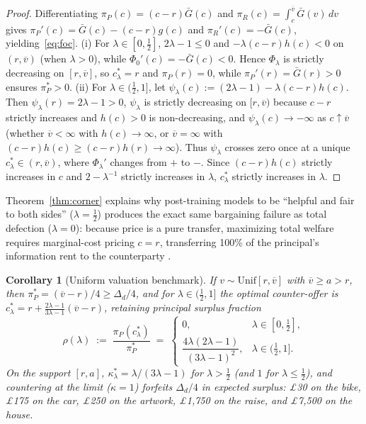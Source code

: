 \documentclass[10.5pt]{article}
\newtheorem{corollary}{Corollary}
\theoremstyle{definition}
\begin{document}
\begin{proof}
Differentiating $\pi_P(c) = (c-r)\bar{G}(c)$ and $\pi_R(c) = \int_c^{\overline v}\bar{G}(v)\,dv$ gives $\pi_P'(c) = \bar{G}(c) - (c-r)g(c)$ and $\pi_R'(c) = -\bar{G}(c)$, yielding~\eqref{eq:foc}.
(i) For $\lambda \in [0, \tfrac{1}{2}]$, $2\lambda - 1 \le 0$ and $-\lambda(c-r)h(c) < 0$ on $(r, \overline v)$ (when $\lambda > 0$), while $\Phi_0'(c) = -\bar{G}(c) < 0$. Hence $\Phi_\lambda$ is strictly decreasing on $[r, \overline v]$, so $c_\lambda^* = r$ and $\pi_P(r) = 0$, while $\pi_P'(r) = \bar{G}(r) > 0$ ensures $\pi_P^* > 0$.
(ii) For $\lambda \in (\tfrac{1}{2}, 1]$, let $\psi_\lambda(c) := (2\lambda - 1) - \lambda(c-r)h(c)$. Then $\psi_\lambda(r) = 2\lambda - 1 > 0$, $\psi_\lambda$ is strictly decreasing on $[r, \overline v)$ because $c-r$ strictly increases and $h(c) > 0$ is non-decreasing, and $\psi_\lambda(c) \to -\infty$ as $c \uparrow \overline v$ (whether $\overline v < \infty$ with $h(c) \to \infty$, or $\overline v = \infty$ with $(c-r)h(c) \ge (c-r)h(r) \to \infty$). Thus $\psi_\lambda$ crosses zero once at a unique $c_\lambda^* \in (r, \overline v)$, where $\Phi_\lambda'$ changes from $+$ to $-$. Since $(c-r)h(c)$ strictly increases in $c$ and $2 - \lambda^{-1}$ strictly increases in $\lambda$, $c_\lambda^*$ strictly increases in $\lambda$.
\end{proof}

Theorem~\ref{thm:corner} explains why post-training models to be ``helpful and fair to both sides'' ($\lambda = \tfrac{1}{2}$) produces the exact same bargaining failure as total defection ($\lambda = 0$): because price is a pure transfer, maximizing total welfare requires marginal-cost pricing $c = r$, transferring 100\% of the principal's information rent to the counterparty \citep{myerson1983}.

\begin{corollary}[Uniform valuation benchmark]\label{cor:uniform}
If $v \sim \mathrm{Unif}[r, \overline v]$ with $\overline v \ge a > r$, then $\pi_P^* = (\overline v - r)/4 \ge \Delta_d/4$, and for $\lambda \in (\tfrac{1}{2}, 1]$ the optimal counter-offer is $c_\lambda^* = r + \frac{2\lambda - 1}{3\lambda - 1}(\overline v - r)$, retaining principal surplus fraction
\begin{equation}\label{eq:rho}
\rho(\lambda) \;:=\; \frac{\pi_P(c_\lambda^*)}{\pi_P^*} \;=\; \begin{cases} 0, & \lambda \in [0, \tfrac{1}{2}], \\[4pt] \dfrac{4\lambda(2\lambda - 1)}{(3\lambda - 1)^2}, & \lambda \in (\tfrac{1}{2}, 1]. \end{cases}
\end{equation}
On the support $[r, a]$, $\kappa_\lambda^* = \lambda/(3\lambda - 1)$ for $\lambda > \tfrac{1}{2}$ (and $1$ for $\lambda \le \tfrac{1}{2}$), and countering at the limit ($\kappa = 1$) forfeits $\Delta_d/4$ in expected surplus: \pounds 30 on the bike, \pounds 175 on the car, \pounds 250 on the artwork, \pounds 1{,}750 on the raise, and \pounds 7{,}500 on the house.
\end{corollary}
\end{document}
